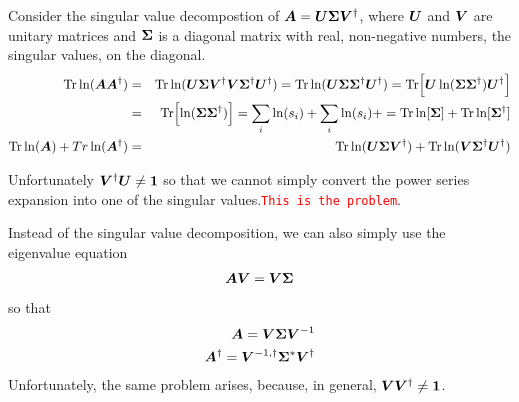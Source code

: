 \documentclass[11pt,a4paper]{report}
\newcommand{\petertt}[1]{\textcolor{red}{\texttt{#1}}}
\begin{document}
Consider the singular value decompostion of
$\bm{A}=\bm{U}\bm{\Sigma}\bm{V}^\dagger$, where $\bm{U}$ and $\bm{V}$ are
unitary matrices and $\bm{\Sigma}$ is a diagonal matrix with real,
non-negative numbers, the singular values, on the diagonal.
\begin{eqnarray}
\mathrm{Tr}\ln(\bm{A}\bm{A}^\dagger)
&=&\mathrm{Tr}\ln(\bm{U}\bm{\Sigma}\bm{V}^\dagger
\bm{V}\bm{\Sigma}^\dagger\bm{U}^\dagger)
=\mathrm{Tr}\ln(\bm{U}\bm{\Sigma}\bm{\Sigma}^\dagger\bm{U}^\dagger)
=\mathrm{Tr}\Bigl[\bm{U}\ln(\bm{\Sigma}\bm{\Sigma}^\dagger)\bm{U}^\dagger\Bigr]
\nonumber\\
&=&\mathrm{Tr}\Bigl[\ln(\bm{\Sigma}\bm{\Sigma}^\dagger)\Bigr]
=\sum_i \ln(s_i)+\sum_i \ln(s_i)+
=\mathrm{Tr}\ln[\bm{\Sigma}]+\mathrm{Tr}\ln[\bm{\Sigma}^\dagger]
\nonumber\\
\mathrm{Tr}\ln(\bm{A})+Tr\ln(\bm{A}^\dagger)
&=&\mathrm{Tr}\ln(\bm{U}\bm{\Sigma}\bm{V}^\dagger)
+\mathrm{Tr}\ln(\bm{V}\bm{\Sigma}^\dagger\bm{U}^\dagger)
\end{eqnarray}

Unfortunately $\bm{V}^\dagger\bm{U}\neq\bm{1}$ so that we cannot
simply convert the power series expansion into one of the singular
values.\petertt{This is the problem}.


Instead of the singular value decomposition, we can also simply use the
eigenvalue equation
\begin{eqnarray}
\bm{A}\bm{V}=\bm{V}\bm{\Sigma}
\end{eqnarray}
so that
\begin{eqnarray}
\bm{A}=\bm{V}\bm{\Sigma}\bm{V}^{-1}
\nonumber\\
\bm{A}^\dagger=\bm{V}^{-1,\dagger}\bm{\Sigma}^*\bm{V}^{\dagger}
\end{eqnarray}
Unfortunately, the same problem arises, because, in general,
$\bm{V}\bm{V}^\dagger\neq\bm{1}$.

\end{document}
